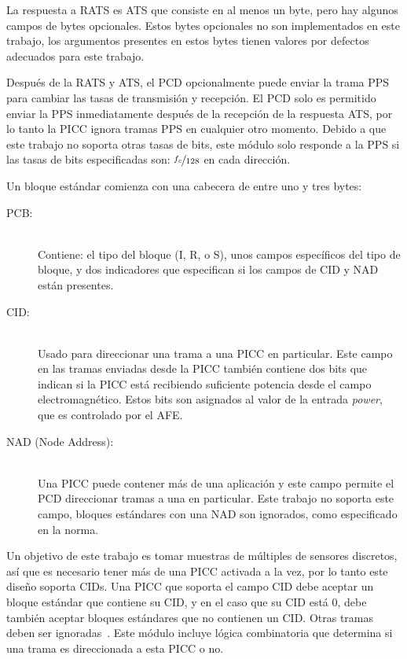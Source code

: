 \documentclass[a4paper, twoside, 11pt]{report}
\begin{document}
La respuesta a RATS es ATS que consiste en al menos un byte, pero hay algunos campos de bytes opcionales. Estos bytes opcionales no son implementados en este trabajo, los argumentos presentes en estos bytes tienen valores por defectos adecuados para este trabajo.

Después de la RATS y ATS, el PCD opcionalmente puede enviar la trama PPS para cambiar las tasas de transmisión y recepción. El PCD solo es permitido enviar la PPS inmediatamente después de la recepción de la respuesta ATS, por lo tanto la PICC ignora tramas PPS en cualquier otro momento. Debido a que este trabajo no soporta otras tasas de bits, este módulo solo responde a la PPS si las tasas de bits especificadas son: $\nicefrac{f_c}{128}$ en cada dirección.

Un bloque estándar comienza con una cabecera de entre uno y tres bytes:

\begin{description}
  \item[PCB:] \hfill \\ Contiene: el tipo del bloque (I, R, o S), unos campos específicos del tipo de bloque, y dos indicadores que especifican si los campos de CID y NAD están presentes.
  \item[CID:] \hfill \\ Usado para direccionar una trama a una PICC en particular. Este campo en las tramas enviadas desde la PICC también contiene dos bits que indican si la PICC está recibiendo suficiente potencia desde el campo electromagnético. Estos bits son asignados al valor de la entrada \textit{power}, que es controlado por el AFE.
  \item[NAD (Node Address):] \hfill \\ Una PICC puede contener más de una aplicación y este campo permite el PCD direccionar tramas a una en particular. Este trabajo no soporta este campo, bloques estándares con una NAD son ignorados, como especificado en la norma.
\end{description}

Un objetivo de este trabajo es tomar muestras de múltiples de sensores discretos, así que es necesario tener más de una PICC activada a la vez, por lo tanto este diseño soporta CIDs. Una PICC que soporta el campo CID debe aceptar un bloque estándar que contiene su CID, y en el caso que su CID está 0, debe también aceptar bloques estándares que no contienen un CID. Otras tramas deben ser ignoradas~\cite{iso14443-4}. Este módulo incluye lógica combinatoria que determina si una trama es direccionada a esta PICC o no.
\end{document}

